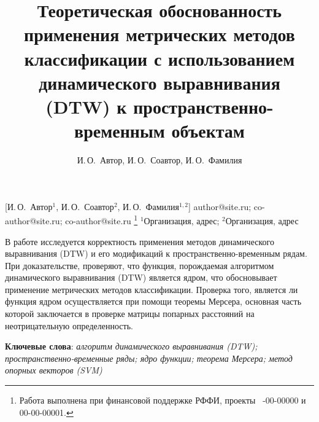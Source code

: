 \documentclass[12pt, twoside]{article}
\begin{document}
\title
    [Обоснованность применения DTW к пространственно-временным объектам] %
    {Теоретическая обоснованность применения метрических методов классификации с использованием динамического выравнивания (DTW) к пространственно-временным объектам}
\author
    [И.\,О.~Автор] %
    {И.\,О.~Автор, И.\,О.~Соавтор, И.\,О.~Фамилия} %
    [И.\,О.~Автор$^1$, И.\,О.~Соавтор$^2$, И.\,О.~Фамилия$^{1,2}$] %
\email
    {author@site.ru; co-author@site.ru;  co-author@site.ru}
\thanks
    {Работа выполнена при
     финансовой поддержке РФФИ, проекты \No\ -00-00000 и 00-00-00001.}
\organization
    {$^1$Организация, адрес; $^2$Организация, адрес}
\abstract
    {В работе исследуется корректность применения методов динамического выравнивания (DTW) и его модификаций к пространственно-временным рядам. При доказательстве, проверяют, что функция, порождаемая алгоритмом динамического выравнивания (DTW) является ядром, что обосновывает применение метрических методов классификации. Проверка того, является ли функция ядром осуществляется при помощи теоремы Мерсера, основная часть которой заключается в проверке матрицы попарных расстояний на неотрицательную определенность. 
	
\bigskip
\noindent
\textbf{Ключевые слова}: \emph {алгоритм динамического выравнивания (DTW); пространственно-временные ряды; ядро функции; теорема Мерсера; метод опорных векторов (SVM)}
}



\maketitle
\linenumbers
\end{document}
